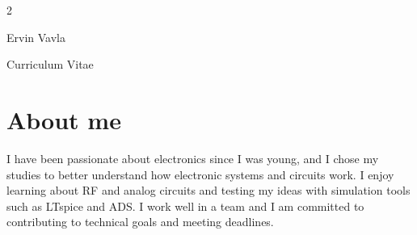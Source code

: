 \documentclass[
	10pt, %
]{FreemanCV}
\begin{document}
\begin{paracol}{2} %



    \parbox[][0.11\textheight][c]{\linewidth}{ %
	\centering %
	
	{\sffamily\Huge Ervin Vavla} %
	
	\medskip %
	
	{\cursivefont\Huge\textcolor{headings}{Curriculum Vitae}}
	
	\vfill %
}



\section{About me}


\medskip %

I have been passionate about electronics since I was young, and I chose my studies to better understand how electronic systems and circuits work. I enjoy learning about RF and analog circuits and testing my ideas with simulation tools such as LTspice and ADS. I work well in a team and I am committed to contributing to technical goals and meeting deadlines.



\end{paracol}
\end{document}
